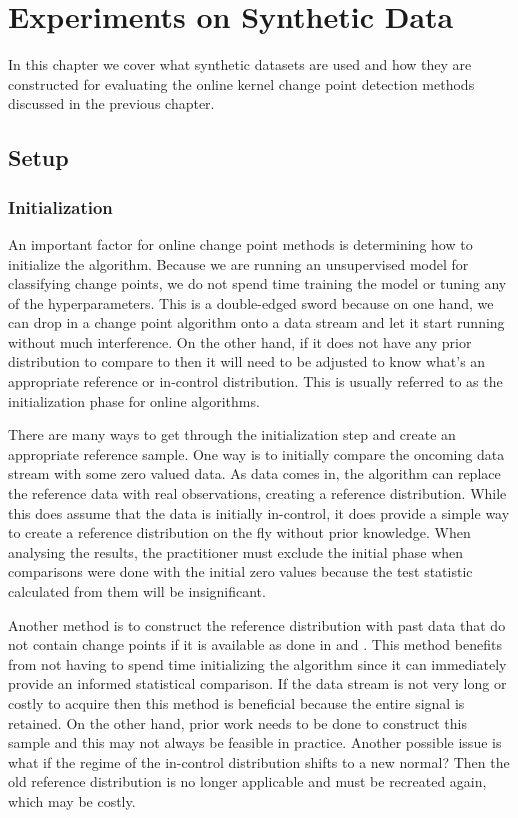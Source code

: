 \chapter{Experiments on Synthetic Data}
In this chapter we cover what synthetic datasets are used and how they are constructed for evaluating the online kernel change point detection methods discussed in the previous chapter.
\section{Setup}
\label{experiments}
\subsection{Initialization}
An important factor for online change point methods is determining how to initialize the algorithm. Because we are running an unsupervised model for classifying change points, we do not spend time training the model or tuning any of the hyperparameters. This is a double-edged sword because on one hand, we can drop in a change point algorithm onto a data stream and let it start running without much interference. On the other hand, if it does not have any prior distribution to compare to then it will need to be adjusted to know what's an appropriate reference or in-control distribution. This is usually referred to as the initialization phase for online algorithms.

There are many ways to get through the initialization step and create an appropriate reference sample. One way is to initially compare the oncoming data stream with some zero valued data. As data comes in, the algorithm can replace the reference data with real observations, creating a reference distribution. While this does assume that the data is initially in-control, it does provide a simple way to create a reference distribution on the fly without prior knowledge. When analysing the results, the practitioner must exclude the initial phase when comparisons were done with the initial zero values because the test statistic calculated from them will be insignificant. 

Another method is to construct the reference distribution with past data that do not contain change points if it is available as done in \cite{li2015m} and \cite{flynn2019change}. This method benefits from not having to spend time initializing the algorithm since it can immediately provide an informed statistical comparison. If the data stream is not very long or costly to acquire then this method is beneficial because the entire signal is retained.  On the other hand, prior work needs to be done to construct this sample and this may not always be feasible in practice. Another possible issue is what if the regime of the in-control distribution shifts to a new normal? Then the old reference distribution is no longer applicable and must be recreated again, which may be costly. 

